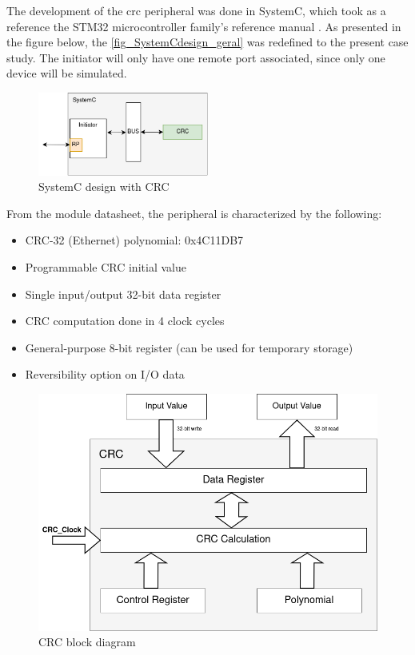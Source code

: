The development of the \gls{crc} peripheral was done in SystemC, which took as a reference the STM32 microcontroller family's 
reference manual \cite{referenceManualRM0385}. As presented in the figure below, the \autoref{fig_SystemCdesign_geral} was redefined to 
the present case study. The initiator will only have one remote port associated, since only one device will be simulated.

\begin{figure}[H]
	\centering
	\includegraphics[width=0.5\textwidth]{Images/SystemCdesign_CRC.png}
	\caption{SystemC design with CRC}
	\label{fig_SystemCdesign_CRC}
\end{figure}

From the module datasheet, the peripheral is characterized by the following:  

\begin{itemize}
	\item CRC-32 (Ethernet) polynomial: 0x4C11DB7
	\item Programmable CRC initial value
	\item Single input/output 32-bit data register
	\item CRC computation done in 4 clock cycles 
	\item General-purpose 8-bit register (can be used for temporary storage)
	\item Reversibility option on I/O data
\end{itemize}

\begin{figure}[]
	\centering
 	\includegraphics[width=0.55\linewidth]{Images/CrcBlockDiagram.png}
 	\caption{CRC block diagram}
	 \label{fig_CrcBlockDiagram}
\end{figure}


